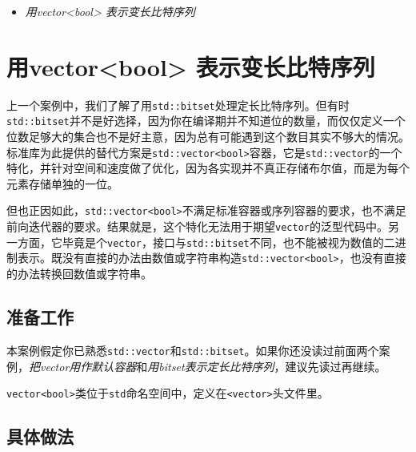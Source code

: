 \begin{itemize}
\item \textit{用vector<bool> 表示变长比特序列}

\end{itemize}



\section{用vector<bool> 表示变长比特序列}



上一个案例中，我们了解了用\texttt{std::\allowbreak{}bitset}处理定长比特序列。但有时\texttt{std::\allowbreak{}bitset}并不是好选择，因为你在编译期并不知道位的数量，而仅仅定义一个位数足够大的集合也不是好主意，因为总有可能遇到这个数目其实不够大的情况。标准库为此提供的替代方案是\texttt{std::\allowbreak{}vector<\allowbreak{}bool>}容器，它是\texttt{std::\allowbreak{}vector}的一个特化，并针对空间和速度做了优化，因为各实现并不真正存储布尔值，而是为每个元素存储单独的一位。



但也正因如此，\texttt{std::\allowbreak{}vector<\allowbreak{}bool>}不满足标准容器或序列容器的要求，也不满足前向迭代器的要求。结果就是，这个特化无法用于期望\texttt{vector}的泛型代码中。另一方面，它毕竟是个\texttt{vector}，接口与\texttt{std::\allowbreak{}bitset}不同，也不能被视为数值的二进制表示。既没有直接的办法由数值或字符串构造\texttt{std::\allowbreak{}vector<\allowbreak{}bool>}，也没有直接的办法转换回数值或字符串。



\subsection{准备工作}



本案例假定你已熟悉\texttt{std::\allowbreak{}vector}和\texttt{std::\allowbreak{}bitset}。如果你还没读过前面两个案例，\textit{把vector用作默认容器}和\textit{用bitset表示定长比特序列}，建议先读过再继续。



\texttt{vector<\allowbreak{}bool>}类位于\texttt{std}命名空间中，定义在\texttt{<\allowbreak{}vector>}头文件里。



\subsection{具体做法}


